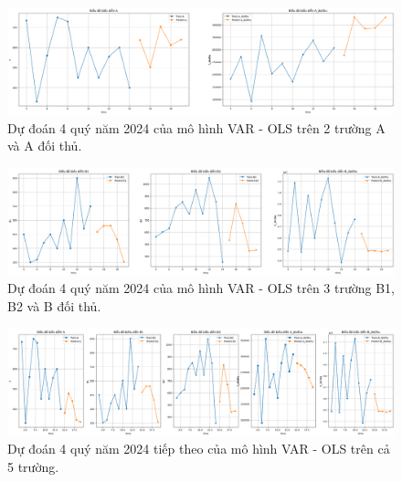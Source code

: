 \begin{figure}[H]
    \centering
    \includegraphics[width = \textwidth]{figure/VAR2.png}
    \caption{Dự đoán 4 quý năm 2024 của mô hình VAR - OLS trên 2 trường A và A đối thủ.}
    \label{fig:var2}
\end{figure}

\begin{figure}[H]
    \centering
    \includegraphics[width = \textwidth]{figure/VAR3.png}
    \caption{Dự đoán 4 quý năm 2024 của mô hình VAR - OLS trên 3 trường B1, B2 và B đối thủ.}
    \label{fig:var2}
\end{figure}

\begin{figure}[H]
    \centering
    \includegraphics[width = \textwidth]{figure/dudoanVAR.png}
    \caption{Dự đoán 4 quý năm 2024 tiếp theo của mô hình VAR - OLS trên cả 5 trường.}
    \label{fig:var5}
\end{figure}